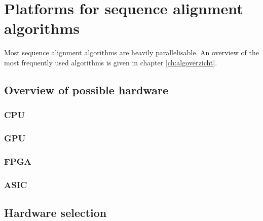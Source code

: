 
\chapter{Platforms for sequence alignment algorithms}
\label{ch:Platforms}

Most sequence alignment algorithms are heavily parallelisable. An overview of the most frequently used algorithms is given in chapter \ref{ch:algoverzicht}.

\section{Overview of possible hardware}

\subsection{CPU}
\subsection{GPU}
\subsection{FPGA}
\subsection{ASIC}

\section{Hardware selection}



